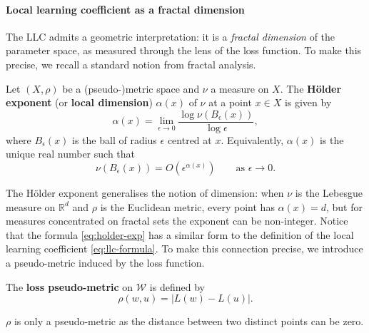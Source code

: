 \documentclass[11pt]{article}
\newcommand{\R}{\mathbb{R}}
\newcommand{\W}{\mathcal{W}}
\begin{document}
\paragraph{Local learning coefficient as a fractal dimension} 

The LLC admits a geometric interpretation: it is a \emph{fractal dimension} of the parameter space, as measured through the lens of the loss function. To make this precise, we recall a standard notion from fractal analysis.

\begin{definition}
\label{def:holder-exponent}
    Let $(X, \rho)$ be a (pseudo-)metric space and $\nu$ a measure on $X$. The \textbf{Hölder exponent} (or \textbf{local dimension}) $\alpha(x)$ of $\nu$ at a point $x \in X$ is given by
    \begin{equation} \label{eq:holder-exp}
        \alpha(x) = \lim_{\epsilon \to 0} \frac{\log \nu(B_\epsilon(x))}{\log \epsilon},
    \end{equation}
    where $B_\epsilon(x)$ is the ball of radius $\epsilon$ centred at $x$. Equivalently, $\alpha(x)$ is the unique real number such that 
    \begin{equation*}
        \nu(B_\epsilon(x)) = O(\epsilon^{\alpha(x)}) \qquad \text{as } \epsilon \to 0.
    \end{equation*}
\end{definition}

The Hölder exponent generalises the notion of dimension: when $\nu$ is the Lebesgue measure on $\R^d$ and $\rho$ is the Euclidean metric, every point has $\alpha(x) = d$, but for measures concentrated on fractal sets the exponent can be non-integer. Notice that the formula \eqref{eq:holder-exp} has a similar form to the definition of the local learning coefficient \eqref{eq:llc-formula}. To make this connection precise, we introduce a pseudo-metric induced by the loss function.

\begin{definition}
\label{def:loss-metric}
    The \textbf{loss pseudo-metric} on $\W$ is defined by
    \begin{equation}
        \rho(w,u) = |L(w) - L(u)|.
    \end{equation}
\end{definition}

\begin{remark}
    $\rho$ is only a pseudo-metric as the distance between two distinct points can be zero. 
\end{remark}
\end{document}
